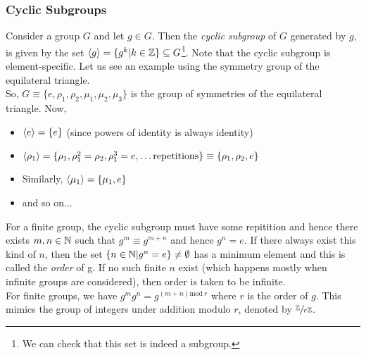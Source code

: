\subsubsection{Cyclic Subgroups}
Consider a group $G$ and let $g\in G$. Then the \textit{cyclic subgroup} of $G$ generated by $g$, is given by the set $\left\langle g \right\rangle = \{g^k|k\in \mathbb{Z} \}\subseteq G$\footnote{We can check that this set is indeed a subgroup.}. Note that the cyclic subgroup is element-specific. Let us see an example using the symmetry group of the equilateral triangle.\\[0.2cm]
So, $G\equiv \{e,\rho_1, \rho_2, \mu_1, \mu_2, \mu_3\}$ is the group of symmetries of the equilateral triangle. Now,
\begin{itemize}
    \item $\left\langle e \right\rangle = \{e\}$ (since powers of identity is always identity)
    \item $\left\langle \rho_1 \right\rangle = \{\rho_1, \rho_1^2 = \rho_2, \rho_1^3 = e, \ldots \text{repetitions}\}\equiv \{\rho_1,\rho_2,e\}$ 
    \item Similarly, $\left\langle \mu_1 \right\rangle = \{\mu_1, e\}$
    \item and so on...
\end{itemize}
For a finite group, the cyclic subgroup must have some repitition and hence there exists $m,n\in \mathbb{N}$ such that $g^m \equiv g^{m+n}$ and hence $g^n = e$. If there always exist this kind of $n$, then the set $\{n\in \mathbb{N}|g^n=e\}\neq \emptyset$ has a minimum element and this is called the \textit{order} of g. If no such finite $n$ exist (which happens mostly when infinite groups are considered), then order is taken to be infinite.\\[0.2cm]
For finite groups, we have $g^m g^n = g^{(m+n) \mathrm{mod} \ r}$ where $r$ is the order of $g$. This mimics the group of integers under addition modulo $r$, denoted by $\sfrac{\mathbb{Z}}{r\mathbb{Z}}$. 

